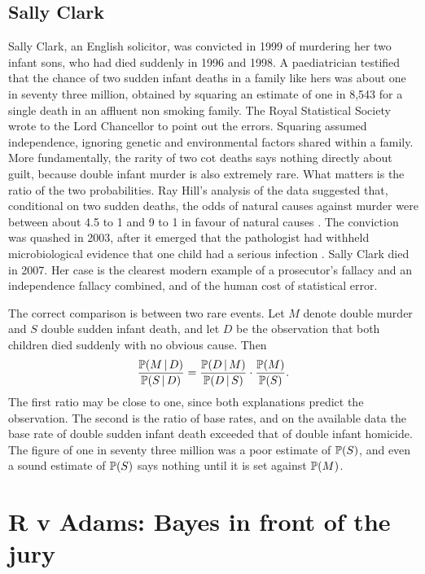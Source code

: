 \subsection{Sally Clark}

Sally Clark, an English solicitor, was convicted in 1999 of murdering her two infant sons, who had died suddenly in 1996 and 1998. A paediatrician testified that the chance of two sudden infant deaths in a family like hers was about one in seventy three million, obtained by squaring an estimate of one in 8{,}543 for a single death in an affluent non smoking family. The Royal Statistical Society wrote to the Lord Chancellor to point out the errors. Squaring assumed independence, ignoring genetic and environmental factors shared within a family. More fundamentally, the rarity of two cot deaths says nothing directly about guilt, because double infant murder is also extremely rare. What matters is the ratio of the two probabilities. Ray Hill's analysis of the data suggested that, conditional on two sudden deaths, the odds of natural causes against murder were between about 4.5 to 1 and 9 to 1 in favour of natural causes \citep{hill2004}. The conviction was quashed in 2003, after it emerged that the pathologist had withheld microbiological evidence that one child had a serious infection \citep{clark2003}. Sally Clark died in 2007. Her case is the clearest modern example of a prosecutor's fallacy and an independence fallacy combined, and of the human cost of statistical error.

The correct comparison is between two rare events. Let $M$ denote double murder and $S$ double sudden infant death, and let $D$ be the observation that both children died suddenly with no obvious cause. Then
\[
\frac{\mathbb{P}(M \,\vert\, D)}{\mathbb{P}(S\,\vert\, D)} = \frac{\mathbb{P}(D\,\vert\, M)}{\mathbb{P}(D \,\vert\, S)} \cdot \frac{\mathbb{P}(M)}{\mathbb{P}(S)} .
\]
The first ratio may be close to one, since both explanations predict the observation. The second is the ratio of base rates, and on the available data the base rate of double sudden infant death exceeded that of double infant homicide. The figure of one in seventy three million was a poor estimate of $\mathbb{P}(S)$, and even a sound estimate of $\mathbb{P}(S)$ says nothing until it is set against $\mathbb{P}(M)$.

\section{R v Adams: Bayes in front of the jury}

